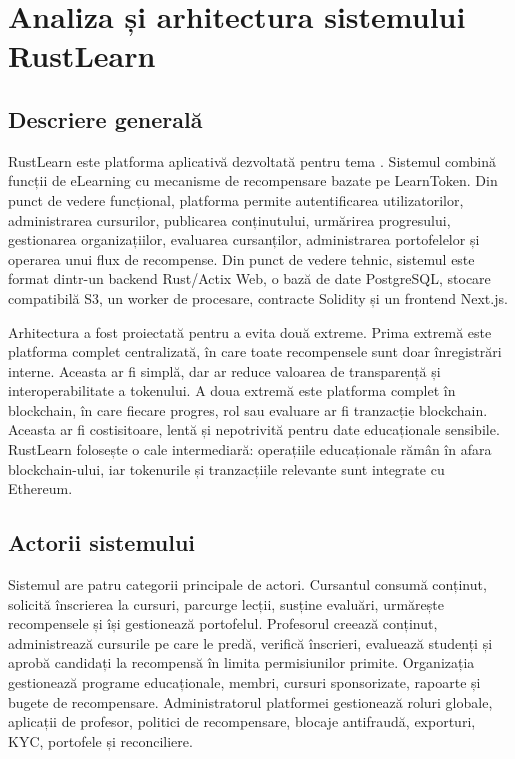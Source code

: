 \chapter{Analiza și arhitectura sistemului RustLearn}

\section{Descriere generală}
RustLearn este platforma aplicativă dezvoltată pentru tema \textit{\titluLucrare}. Sistemul combină funcții de eLearning cu mecanisme de recompensare bazate pe LearnToken. Din punct de vedere funcțional, platforma permite autentificarea utilizatorilor, administrarea cursurilor, publicarea conținutului, urmărirea progresului, gestionarea organizațiilor, evaluarea cursanților, administrarea portofelelor și operarea unui flux de recompense. Din punct de vedere tehnic, sistemul este format dintr-un backend Rust/Actix Web, o bază de date PostgreSQL, stocare compatibilă S3, un worker de procesare, contracte Solidity și un frontend Next.js.

Arhitectura a fost proiectată pentru a evita două extreme. Prima extremă este platforma complet centralizată, în care toate recompensele sunt doar înregistrări interne. Aceasta ar fi simplă, dar ar reduce valoarea de transparență și interoperabilitate a tokenului. A doua extremă este platforma complet în blockchain, în care fiecare progres, rol sau evaluare ar fi tranzacție blockchain. Aceasta ar fi costisitoare, lentă și nepotrivită pentru date educaționale sensibile. RustLearn folosește o cale intermediară: operațiile educaționale rămân în afara blockchain-ului, iar tokenurile și tranzacțiile relevante sunt integrate cu Ethereum.

\section{Actorii sistemului}
Sistemul are patru categorii principale de actori. Cursantul consumă conținut, solicită înscrierea la cursuri, parcurge lecții, susține evaluări, urmărește recompensele și își gestionează portofelul. Profesorul creează conținut, administrează cursurile pe care le predă, verifică înscrieri, evaluează studenți și aprobă candidați la recompensă în limita permisiunilor primite. Organizația gestionează programe educaționale, membri, cursuri sponsorizate, rapoarte și bugete de recompensare. Administratorul platformei gestionează roluri globale, aplicații de profesor, politici de recompensare, blocaje antifraudă, exporturi, KYC, portofele și reconciliere.

